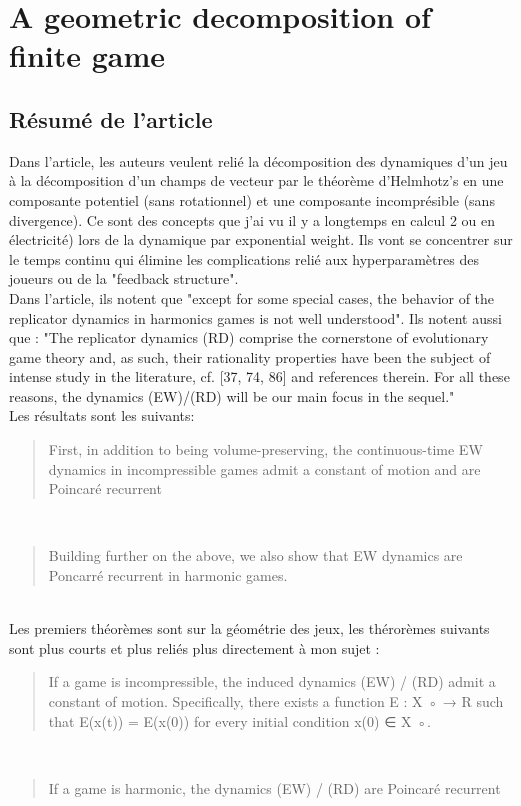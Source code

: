 \documentclass{article}
\begin{document}
\section{A geometric decomposition of finite game \cite{legacci_geometric_2024}}

\subsection{Résumé de l'article}
Dans l'article, les auteurs veulent relié la décomposition des dynamiques d'un jeu à la décomposition d'un champs de vecteur par le théorème d'Helmhotz's en une composante potentiel (sans rotationnel) et une composante incomprésible (sans divergence). Ce sont des concepts que j'ai vu il y a longtemps en calcul 2 ou en électricité) lors de la dynamique par exponential weight. Ils vont se concentrer sur le temps continu qui élimine les complications relié aux hyperparamètres des joueurs ou de la "feedback structure".
\\
Dans l'article, ils notent que "except for some special cases, the behavior of the replicator dynamics in harmonics games is not well understood". Ils notent aussi que : "The replicator dynamics (RD) comprise the cornerstone of evolutionary game theory and, as such, their rationality properties have been the subject of intense study in the literature, cf. [37, 74, 86] and references therein. For all these reasons, the dynamics (EW)/(RD) will be our main focus in the sequel."
\\
Les résultats sont les suivants: 
\begin{quote}
    First, in addition to being volume-preserving, the continuous-time EW dynamics in incompressible games admit a constant of motion and are Poincaré recurrent
\end{quote}
\\
\begin{quote}
Building further on the above, we also show that EW dynamics are Poncarré recurrent in harmonic games.
\end{quote}
\\
Les premiers théorèmes sont sur la géométrie des jeux, les thérorèmes suivants sont plus courts et plus reliés plus directement à mon sujet : 
\begin{quote}
    If a game is incompressible, the induced dynamics (EW) / (RD) admit a constant of motion. Specifically, there exists a function E : X ◦ → R such that E(x(t)) = E(x(0)) for every initial condition x(0) ∈ X ◦.
\end{quote}
\\
\begin{quote}
    If a game is harmonic, the dynamics (EW) / (RD) are Poincaré recurrent
\end{quote}
\end{document}
